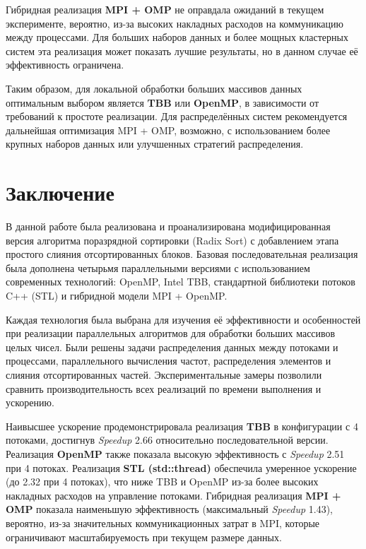 \documentclass[12pt]{article}
\begin{document}
\hspace*{1.25em}Гибридная реализация \textbf{MPI + OMP} не оправдала ожиданий в текущем эксперименте, вероятно, из-за высоких накладных расходов на коммуникацию между процессами. Для больших наборов данных и более мощных кластерных систем эта реализация может показать лучшие результаты, но в данном случае её эффективность ограничена.

\hspace*{1.25em}Таким образом, для локальной обработки больших массивов данных оптимальным выбором является \textbf{TBB} или \textbf{OpenMP}, в зависимости от требований к простоте реализации. Для распределённых систем рекомендуется дальнейшая оптимизация MPI + OMP, возможно, с использованием более крупных наборов данных или улучшенных стратегий распределения.

\section{Заключение}

\hspace*{1.25em}В данной работе была реализована и проанализирована модифицированная версия алгоритма поразрядной сортировки (Radix Sort) с добавлением этапа простого слияния отсортированных блоков. Базовая последовательная реализация была дополнена четырьмя параллельными версиями с использованием современных технологий: OpenMP, Intel TBB, стандартной библиотеки потоков C++ (STL) и гибридной модели MPI + OpenMP.

\hspace*{1.25em}Каждая технология была выбрана для изучения её эффективности и особенностей при реализации параллельных алгоритмов для обработки больших массивов целых чисел. Были решены задачи распределения данных между потоками и процессами, параллельного вычисления частот, распределения элементов и слияния отсортированных частей. Экспериментальные замеры позволили сравнить производительность всех реализаций по времени выполнения и ускорению.

\hspace*{1.25em}Наивысшее ускорение продемонстрировала реализация \textbf{TBB} в конфигурации с 4 потоками, достигнув \textit{Speedup} 2.66 относительно последовательной версии. Реализация \textbf{OpenMP} также показала высокую эффективность с \textit{Speedup} 2.51 при 4 потоках. Реализация \textbf{STL (std::thread)} обеспечила умеренное ускорение (до 2.32 при 4 потоках), что ниже TBB и OpenMP из-за более высоких накладных расходов на управление потоками. Гибридная реализация \textbf{MPI + OMP} показала наименьшую эффективность (максимальный \textit{Speedup} 1.43), вероятно, из-за значительных коммуникационных затрат в MPI, которые ограничивают масштабируемость при текущем размере данных.
\end{document}
